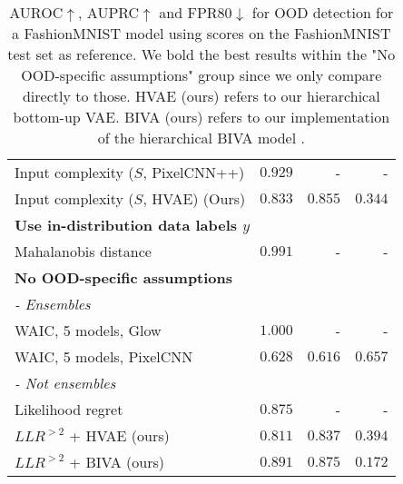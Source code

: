 {\begin{table}[t!]
{\begin{tabular}{lrrr}
Input complexity ($S$, PixelCNN++) \cite{serra_input_2020}             & $0.929$ & - & - \\
Input complexity ($S$, HVAE) (Ours) \cite{serra_input_2020}\footnotemark & $0.833$ & $0.855$ & $0.344$ \\
         \multicolumn{4}{l}{\textbf{Use in-distribution data labels $y$}} \\
Mahalanobis distance {\cite{lee_simple_2018}}                          & $0.991$ & - & -  \\
         \multicolumn{4}{l}{\textbf{No OOD-specific assumptions}} \\
         \multicolumn{4}{l}{\textit{- Ensembles}} \\
WAIC, 5 models, Glow {\cite{choi_waic_2019}}                          & $1.000$ & - & - \\
WAIC, 5 models, PixelCNN {\cite{ren_likelihood_2019}}                      & $0.628$ & $0.616$ & $0.657$ \\
         \multicolumn{4}{l}{\textit{- Not ensembles}} \\
Likelihood regret \cite{xiao_likelihood_2020}                               & $0.875$ & - & - \\
$LLR^{>2}$ + HVAE (ours)                            & $0.811$ & $0.837$ & $0.394$ \\
$LLR^{>2}$ + BIVA (ours)                            & $\mathbf{0.891}$ & $\mathbf{0.875}$ & $\mathbf{0.172}$ \\
         \bottomrule
    \end{tabular}%
    }
    \caption[AUROC, AUPRC, and FPR80 of generative models for OOD detection (MNIST/FashionMNIST and SVHN/CIFAR10).]{%
        AUROC$\uparrow$, AUPRC$\uparrow$ and FPR80$\downarrow$ for OOD detection for a FashionMNIST model using scores on the FashionMNIST test set as reference. We bold the best results within the "No OOD-specific assumptions" group since we only compare directly to those.
        HVAE (ours) refers to our hierarchical bottom-up VAE.
        BIVA (ours) refers to our implementation of the hierarchical BIVA model \cite{maaloe_biva_2019}.
    }
    \label{tab_hierarchical:rocauc-ood}
\end{table}


}
